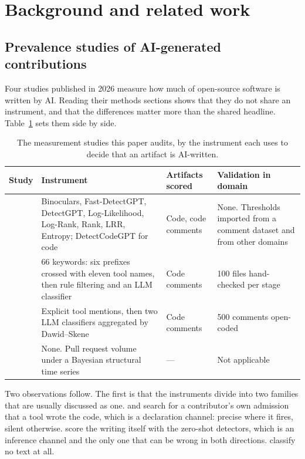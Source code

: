 \section{Background and related work}
\label{sec:background}

\subsection{Prevalence studies of AI-generated contributions}
\label{sec:background:prevalence}

Four studies published in 2026 measure how much of open-source software is written by
AI. Reading their methods sections shows that they do not share an instrument, and that
the differences matter more than the shared headline. Table~\ref{tab:targets} sets them
side by side.

\begin{table}[t]
\caption{The measurement studies this paper audits, by the instrument each uses to
decide that an artifact is AI-written.}
\label{tab:targets}
\small
\begin{tabular}{@{}p{}p{}p{}p{}@{}}
\toprule
Study & Instrument & Artifacts scored & Validation in domain \\
\midrule
\citet{ji2026exploratory} &
Binoculars, Fast-DetectGPT, DetectGPT, Log-Likelihood, Log-Rank, Rank, LRR, Entropy;
DetectCodeGPT for code &
Code, code comments &
None. Thresholds imported from a comment dataset and from other domains \\
\addlinespace
\citet{mao2026measurement} &
66 keywords: six prefixes crossed with eleven tool names, then rule filtering and an
LLM classifier &
Code comments &
100 files hand-checked per stage \\
\addlinespace
\citet{almujahid2026aiusage} &
Explicit tool mentions, then two LLM classifiers aggregated by Dawid--Skene &
Code comments &
500 comments open-coded \\
\addlinespace
\citet{afroz2026aislop} &
None. Pull request volume under a Bayesian structural time series &
--- &
Not applicable \\
\bottomrule
\end{tabular}
\end{table}

Two observations follow. The first is that the instruments divide into two families that
are usually discussed as one. \citet{mao2026measurement} and \citet{almujahid2026aiusage}
search for a contributor's own admission that a tool wrote the code, which is a
declaration channel: precise where it fires, silent otherwise. \citet{ji2026exploratory}
score the writing itself with the zero-shot detectors, which is an inference channel and
the only one that can be wrong in both directions. \citet{afroz2026aislop} classify no
text at all.

